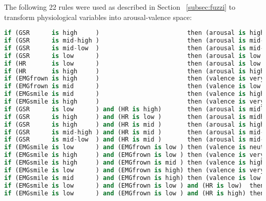 
The following 22 rules were used as described in Section ~\ref{subsec:fuzzi} to transform physiological variables into arousal-valence space:

\begin{lstlisting}[language=python]
if (GSR      is high     )                        then (arousal is high     )
if (GSR      is mid-high )                        then (arousal is mid-high )
if (GSR      is mid-low  )                        then (arousal is mid-low  )
if (GSR      is low      )                        then (arousal is low      )
if (HR       is low      )                        then (arousal is low      )
if (HR       is high     )                        then (arousal is high     )
if (EMGfrown is high     )                        then (valence is very low )
if (EMGfrown is mid      )                        then (valence is low      )
if (EMGsmile is mid      )                        then (valence is high     )
if (EMGsmile is high     )                        then (valence is very high)
if (GSR      is low      ) and (HR is high)       then (arousal is midlow   )
if (GSR      is high     ) and (HR is low )       then (arousal is midhigh  )
if (GSR      is high     ) and (HR is mid )       then (arousal is high     )
if (GSR      is mid-high ) and (HR is mid )       then (arousal is mid-high )
if (GSR      is mid-low  ) and (HR is mid )       then (arousal is mid-low  )
if (EMGsmile is low      ) and (EMGfrown is low ) then (valence is neutral  )
if (EMGsmile is high     ) and (EMGfrown is low ) then (valence is very high)
if (EMGsmile is high     ) and (EMGfrown is mid ) then (valence is high     )
if (EMGsmile is low      ) and (EMGfrown is high) then (valence is very low )
if (EMGsmile is mid      ) and (EMGfrown is high) then (valence is low      )
if (EMGsmile is low      ) and (EMGfrown is low ) and (HR is low)  then (valence is low)
if (EMGsmile is low      ) and (EMGfrown is low ) and (HR is high) then (valence is high)
\end{lstlisting}

